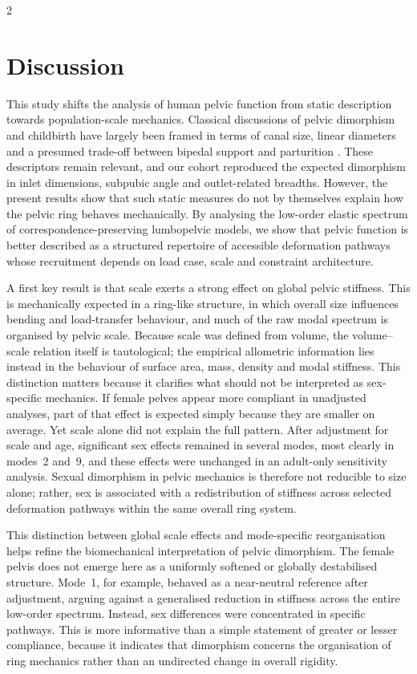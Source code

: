 \documentclass[openacc]{rsproca_new}
\begin{document}
\begin{multicols}{2}
\section{Discussion}

This study shifts the analysis of human pelvic function from static description towards population-scale mechanics. Classical discussions of pelvic dimorphism and childbirth have largely been framed in terms of canal size, linear diameters and a presumed trade-off between bipedal support and parturition \cite{RosenbergTrevathan2002,Trevathan2015,Grunstra2023}. These descriptors remain relevant, and our cohort reproduced the expected dimorphism in inlet dimensions, subpubic angle and outlet-related breadths. However, the present results show that such static measures do not by themselves explain how the pelvic ring behaves mechanically. By analysing the low-order elastic spectrum of correspondence-preserving lumbopelvic models, we show that pelvic function is better described as a structured repertoire of accessible deformation pathways whose recruitment depends on load case, scale and constraint architecture.

A first key result is that scale exerts a strong effect on global pelvic stiffness. This is mechanically expected in a ring-like structure, in which overall size influences bending and load-transfer behaviour, and much of the raw modal spectrum is organised by pelvic scale. Because scale was defined from volume, the volume--scale relation itself is tautological; the empirical allometric information lies instead in the behaviour of surface area, mass, density and modal stiffness. This distinction matters because it clarifies what should not be interpreted as sex-specific mechanics. If female pelves appear more compliant in unadjusted analyses, part of that effect is expected simply because they are smaller on average. Yet scale alone did not explain the full pattern. After adjustment for scale and age, significant sex effects remained in several modes, most clearly in modes~2 and~9, and these effects were unchanged in an adult-only sensitivity analysis. Sexual dimorphism in pelvic mechanics is therefore not reducible to size alone; rather, sex is associated with a redistribution of stiffness across selected deformation pathways within the same overall ring system.

This distinction between global scale effects and mode-specific reorganisation helps refine the biomechanical interpretation of pelvic dimorphism. The female pelvis does not emerge here as a uniformly softened or globally destabilised structure. Mode~1, for example, behaved as a near-neutral reference after adjustment, arguing against a generalised reduction in stiffness across the entire low-order spectrum. Instead, sex differences were concentrated in specific pathways. This is more informative than a simple statement of greater or lesser compliance, because it indicates that dimorphism concerns the organisation of ring mechanics rather than an undirected change in overall rigidity.


\end{multicols}
\end{document}
